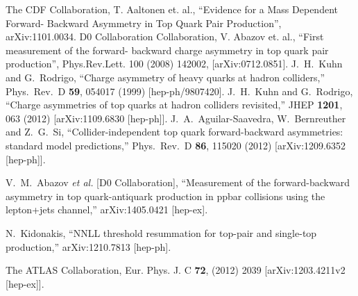 \documentclass{cmspaperpdf}
\begin{document}
\newpage
\begin{thebibliography}{9}
  The CDF Collaboration, T. Aaltonen et. al., ``Evidence for a Mass Dependent Forward- Backward Asymmetry in Top Quark Pair Production'', arXiv:1101.0034.
   D0 Collaboration Collaboration, V. Abazov et. al., ``First measurement of the forward- backward charge asymmetry in top quark pair production'', Phys.Rev.Lett. 100 (2008) 142002, [arXiv:0712.0851].
  J.~H.~Kuhn and G.~Rodrigo,
  ``Charge asymmetry of heavy quarks at hadron colliders,''
  Phys.\ Rev.\ D {\bf 59}, 054017 (1999)
  [hep-ph/9807420].
  J.~H.~Kuhn and G.~Rodrigo,
  ``Charge asymmetries of top quarks at hadron colliders revisited,''
  JHEP {\bf 1201}, 063 (2012)
  [arXiv:1109.6830 [hep-ph]].
  J.~A.~Aguilar-Saavedra, W.~Bernreuther and Z.~G.~Si,
  ``Collider-independent top quark forward-backward asymmetries: standard model predictions,''
  Phys.\ Rev.\ D {\bf 86}, 115020 (2012)
  [arXiv:1209.6352 [hep-ph]].
  
  V.~M.~Abazov {\it et al.}  [D0 Collaboration],
  ``Measurement of the forward-backward asymmetry in top quark-antiquark production in ppbar collisions using the lepton+jets channel,''
  arXiv:1405.0421 [hep-ex].

  N.~Kidonakis,
  ``NNLL threshold resummation for top-pair and single-top production,''
  arXiv:1210.7813 [hep-ph].
  
 The ATLAS Collaboration, Eur. Phys. J. C \textbf{72}, (2012) 2039 [arXiv:1203.4211v2 [hep-ex]].
   

\end{thebibliography}
\end{document}
